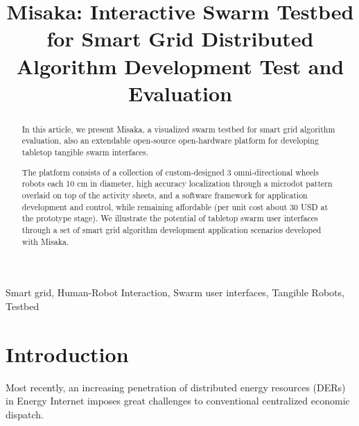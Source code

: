 \documentclass[conference]{IEEEtran}
\begin{document}
\title{Misaka: Interactive Swarm Testbed for Smart Grid Distributed Algorithm Development Test and Evaluation\\}

\author{
\and
{}
}

\maketitle

\begin{abstract}
    In this article, we present Misaka, a visualized swarm testbed for smart grid algorithm evaluation, also an extendable open-source open-hardware platform for developing tabletop tangible swarm interfaces\cite{yan2019consensus}.

    The platform consists of a collection of custom-designed 3 omni-directional wheels robots each 10 cm in diameter, high accuracy localization through a microdot pattern overlaid on top of the activity sheets, and a software framework for application development and control, while remaining affordable (per unit cost about 30 USD at the prototype stage). We illustrate the potential of tabletop swarm user interfaces through a set of smart grid algorithm development application scenarios developed with Misaka.
\end{abstract}

\begin{IEEEkeywords}
    Smart grid, Human-Robot Interaction, Swarm user interfaces, Tangible Robots, Testbed
\end{IEEEkeywords}

\section{Introduction}

Most recently, an increasing penetration of distributed energy resources (DERs) in Energy Internet imposes great challenges to conventional centralized economic dispatch\cite{yan2019consensus}.
\end{document}

